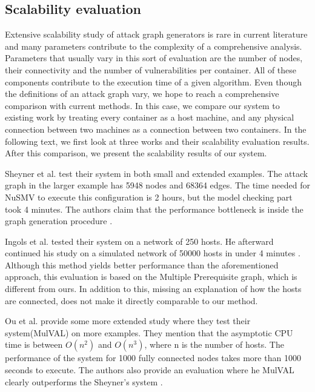 \subsection{Scalability evaluation}
\label{chap:scalability_eval}
Extensive scalability study of attack graph generators is rare in current literature and many parameters contribute to the complexity of a comprehensive analysis. Parameters that usually vary in this sort of evaluation are the number of nodes, their connectivity and the number of vulnerabilities per container. All of these components contribute to the execution time of a given algorithm. Even though the definitions of an attack graph vary, we hope to reach a comprehensive comparison with current methods. In this case, we compare our system to existing work by treating every container as a host machine, and any physical connection between two machines as a connection between two containers. In the following text, we first look at three works and their scalability evaluation results. After this comparison, we present the scalability results of our system.

Sheyner et al. test their system in both small and extended examples. The attack graph in the larger example has 5948 nodes and 68364 edges. The time needed for NuSMV to execute this configuration is 2 hours, but the model checking part took 4 minutes. The authors claim that the performance bottleneck is inside the graph generation procedure \cite{sheyner2002automated}. 

Ingols et al. tested their system on a network of 250 hosts. He afterward continued his study on a simulated network of 50000 hosts in under 4 minutes \cite{ingols2006practical}. Although this method yields better performance than the aforementioned approach, this evaluation is based on the Multiple Prerequisite graph, which is different from ours. In addition to this, missing an explanation of how the hosts are connected, does not make it directly comparable to our method.

Ou et al. provide some more extended study where they test their system(MulVAL) on more examples. They mention that the asymptotic CPU time is between $O(n^2)$ and $O(n^3)$, where n is the number of hosts. The performance of the system for 1000 fully connected nodes takes more than 1000 seconds to execute. The authors also provide an evaluation where he MulVAL clearly outperforms the Sheyner's system \cite{ou2006scalable}.

